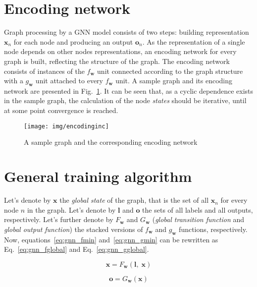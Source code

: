 \section{Encoding network}
Graph processing by a GNN model consists of two steps: building representation $\bm{x}_n$ for each node and producing an output $\bm{o}_n$. As the representation of a single node depends on other nodes representations, an encoding network for every graph is built, reflecting the structure of the graph. The encoding network consists of instances of the $f_{\bm{w}}$ unit connected according to the graph structure with a $g_{\bm{w}}$ unit attached to every $f_{\bm{w}}$ unit. A sample graph and its encoding network are presented in Fig.~\ref{fig:gnn_encoding}.
It can be seen that, as a cyclic dependence exists in the sample graph, the calculation of the node \emph{states} should be iterative, until at some point convergence is reached.

\begin{figure}[h!]
\begin{center}
	\texttt{[image: img/encodinginc]}
	\caption{A sample graph and the corresponding encoding network}
	\label{fig:gnn_encoding}
\end{center}
\end{figure}


\section{General training algorithm}
Let's denote by $\bm{x}$ the \emph{global state} of the graph, that is the set of all $\bm{x}_n$ for every node $n$ in the graph. Let's denote by $\bm{l}$ and $\bm{o}$ the sets of all labels and all outputs, respectively. Let's further denote by $F_{\bm{w}}$ and $G_{\bm{w}}$ (\emph{global transition function} and \emph{global output function}) the stacked versions of $f_{\bm{w}}$ and $g_{\bm{w}}$ functions, respectively. Now, equations~\ref{eq:gnn_fmin} and~\ref{eq:gnn_gmin} can be rewritten as Eq.~\ref{eq:gnn_fglobal} and Eq.~\ref{eq:gnn_gglobal}.

\newpage
\begin{equation}
\bm{x} = F_{\bm{w}}(\bm{l}, \; \bm{x})
\label{eq:gnn_fglobal}
\end{equation}

\begin{equation}
\bm{o} = G_{\bm{w}}(\bm{x})
\label{eq:gnn_gglobal}
\end{equation}

